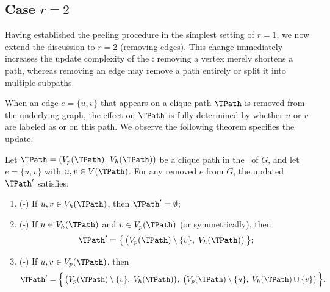 \subsection{Case $r=2$}

Having established the peeling procedure in the simplest setting of $r{=}1$, we now extend the discussion to $r=2$ (removing edges).
This change immediately increases the update complexity of the \cpi: removing a vertex merely shortens a path, whereas removing an edge may remove a path entirely or split it into multiple subpaths.


When an edge $e=\{u,v\}$ that appears on a clique path $\TPath$ is removed from the underlying graph, the effect on $\TPath$ is fully determined by whether $u$ or $v$ are labeled as \emph{\hold} or \emph{\pivot} on this path. We observe the following theorem specifies the update.

\begin{theorem}\label{thm:remove_edge}
Let $\TPath=(V_p(\TPath),\,V_h(\TPath))$ be a clique path in the \cpi\ of $G$, and let $e=\{u,v\}$ with $u,v\in V(\TPath)$. For any removed $e$ from $G$,  the updated $\TPath'$ satisfies:

\begin{enumerate}[leftmargin=*]
  \item (\hold-\hold) If $u,v\in V_h(\TPath)$, then $\TPath'=\emptyset$;
  \item (\hold-\pivot) If $u\in V_h(\TPath)$ and $v\in V_p(\TPath)$ (or symmetrically), then
        \[
          \TPath'=\bigl\{\,\bigl(V_p(\TPath)\setminus\{v\},\; V_h(\TPath)\bigr)\,\bigr\};
        \]
  \item (\pivot-\pivot) If $u,v\in V_p(\TPath)$, then
        \[
          \TPath'=\Bigl\{\,
              \bigl(V_p(\TPath)\setminus\{v\},\; V_h(\TPath)\bigr),\;
              \bigl(V_p(\TPath)\setminus\{u\},\; V_h(\TPath)\cup\{v\}\bigr)
            \,\Bigr\}.
        \]
\end{enumerate}

\end{theorem}


